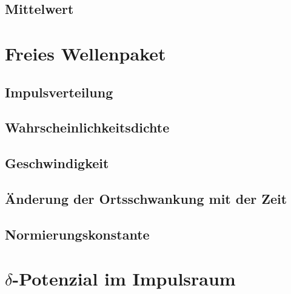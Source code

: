 \subsection{Mittelwert}

\section{Freies Wellenpaket}

\subsection{Impulsverteilung}

\subsection{Wahrscheinlichkeitsdichte}

\subsection{Geschwindigkeit}

\subsection{Änderung der Ortsschwankung mit der Zeit}

\subsection{Normierungskonstante}

\section{$\delta$-Potenzial im Impulsraum}


